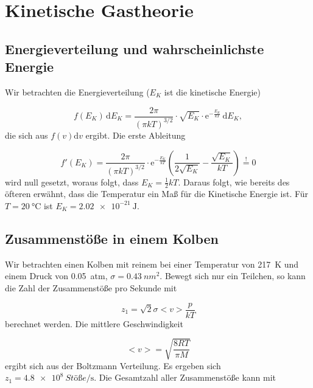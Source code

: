 \section{Kinetische Gastheorie}

  \subsection{Energieverteilung und wahrscheinlichste Energie}

    Wir betrachten die Energieverteilung ($E_K$ ist die kinetische Energie)

      \begin{equation}
        f(E_{K}) \, \text{d}E_K= \frac{2\pi}{\left(\pi k T\right)^{3/2}} \cdot \sqrt{E_{K}} \cdot \mathrm{e}^{-\frac{E_{K}}{kT}} \, \text{d}E_K,
      \end{equation}
    die sich aus $f(v) \text{d}v$ ergibt. Die erste Ableitung
    
      \begin{equation}
        f'(E_{K}) = \frac{2\pi}{\left(\pi k T\right)^{3/2}} \cdot \mathrm{e}^{-\frac{E_{K}}{kT}}  \left(\frac{1}{2\sqrt{E_{K}}}  - \frac{\sqrt{E_{K}}}{kT} \right) \overset{!}{=} 0
      \end{equation}
      wird null gesetzt, woraus folgt, dass $E_K = \frac{1}{2} kT$. Daraus folgt, wie bereits des öfteren erwähnt, dass die Temperatur ein Maß für die Kinetische Energie ist. Für $T = \SI[mode=text]{20}{\degreeCelsius}$ ist $E_K = \SI[mode=text]{2.02e-21}{\joule}$.

  \subsection{Zusammenstöße in einem  Kolben}
  
    Wir betrachten einen Kolben mit reinem  bei einer Temperatur von \SI[mode=text]{217}{\kelvin} und einem Druck von \SI[mode=text]{0.05}{atm}, $\sigma = \SI[mode=text]{0.43}{nm^2}$. Bewegt sich nur ein Teilchen, so kann die Zahl der Zusammenstöße pro Sekunde mit 
    
      \begin{equation}
        z_{1} = \sqrt{2} \sigma < v > \frac{p}{kT}  
      \end{equation}
    berechnet werden. Die mittlere Geschwindigkeit 

      \begin{equation}
        < v > = \sqrt{\frac{8RT}{\pi M}}
      \end{equation}          
    ergibt sich aus der Boltzmann Verteilung. Es ergeben sich $z_1 = \SI[mode=text]{4.8e8}{Stöße\per\second}$. Die Gesamtzahl aller Zusammenstöße kann mit 
    
